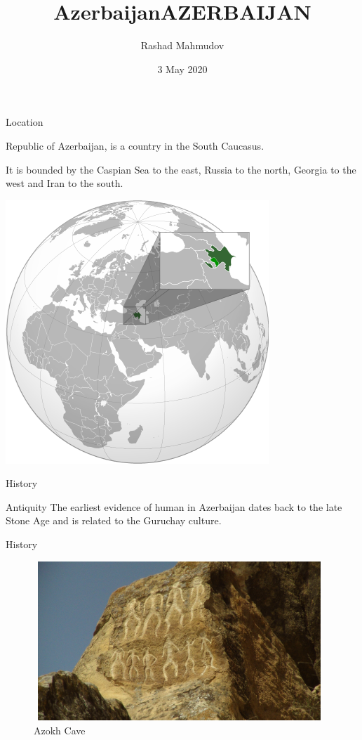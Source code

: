 \documentclass[hyperref={pdfpagemode=FullScreen}]{beamer}
\title{Azerbaijan}
\title{AZERBAIJAN}
\author{Rashad Mahmudov}
\date{3 May 2020}
\begin{document}
\begin{frame}
\titlepage
\end{frame}

\setlength{\columnsep}{0.7cm}
\begin{frame}{Location}

\begin{multicols}{2}

\justifying 
Republic of Azerbaijan, is a country in the South Caucasus.


It is bounded by the Caspian Sea to the east, Russia to the north, Georgia to the west and Iran to the south. 

\columnbreak
\hspace{.2cm}
\includegraphics[scale=.32]{img/aze01.png}
\end{multicols}
\end{frame}


\begin{frame}{History}
\begin{alertblock}{Antiquity}
\justifying The earliest evidence of human in  Azerbaijan dates back to the late Stone Age and is related to the Guruchay culture.
\end{alertblock}
\end{frame}


\begin{frame}{History}
    \begin{figure}
        \includegraphics[width=11cm, height=6cm]{img/aze02.jpg}
        \caption{Azokh Cave} 
    \end{figure}
\end{frame}
\end{document}
